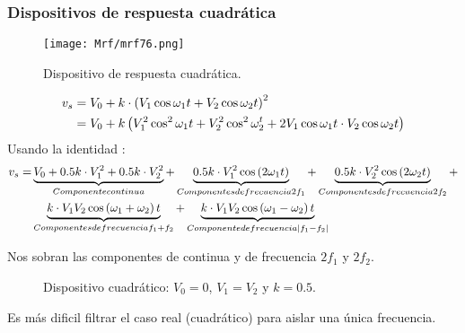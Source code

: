 \documentclass[
	12pt, %
	fleqn, %
	a4paper, %
	oneside, %
]{LegrandOrangeBook}
\begin{document}
\subsubsection*{Dispositivos de respuesta cuadrática}
\begin{figure}[H]
\centering
\texttt{[image: Mrf/mrf76.png]}
\caption{Dispositivo de respuesta cuadrática.}
\end{figure}
\begin{align*}
v_s&=V_0+k\cdot\left(V_1\cos\omega_1t+V_2\cos\omega_2t\right)^2\\
&=V_0+k\left(V_1^2\cos^2\omega_1t+V_2^2\cos^2\omega_2^t+2V_1\cos\omega_1t\cdot V_2\cos\omega_2t\right)
\end{align*}
Usando la identidad :
\begin{align*}
v_s=&\underbrace{V_0+0.5k\cdot V_1^2+0.5k\cdot V_2^2}_{Componente continua}+\underbrace{0.5k\cdot V_1^2\cos\left(2\omega_1t\right)}_{Componentes de frecuencia 2f_1}+\underbrace{0.5k\cdot V_2^2\cos\left(2\omega_2t\right)}_{Componentes de frecuencia 2f_2}+\\
&\underbrace{k\cdot V_1V_2\cos\left(\omega_1+\omega_2\right)t}_{Componentes de frecuencia f_1+f_2}+\underbrace{k\cdot V_1V_2\cos\left(\omega_1-\omega_2\right)t}_{Componente de frecuencia |f_1-f_2|}
\end{align*}
\begin{corollary}
Nos sobran las componentes de continua y de frecuencia $2f_1$ y $2f_2$.
\end{corollary}
\begin{figure}[]
\centering
{}
\caption{Dispositivo cuadrático: $V_0=0$, $V_1=V_2$ y $k=0.5$.}
\end{figure}
Es más dificil filtrar el caso real (cuadrático) para aislar una única frecuencia.
\end{document}
